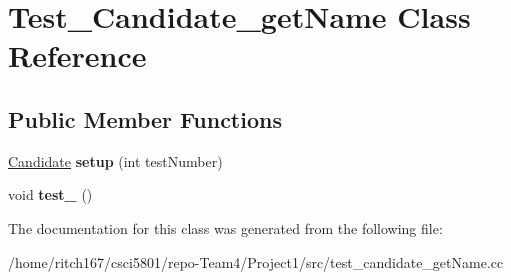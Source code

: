 \hypertarget{classTest__Candidate__getName}{}\section{Test\+\_\+\+Candidate\+\_\+get\+Name Class Reference}
\label{classTest__Candidate__getName}
\subsection*{Public Member Functions}
\begin{DoxyCompactItemize}
\item 
\mbox{\label{classTest__Candidate__getName_a598893e5c791eee9fcd84e627dcb12ec}} 
\hyperlink{classCandidate}{Candidate} {\bfseries setup} (int test\+Number)
\item 
\mbox{\label{classTest__Candidate__getName_a9647623ffa9cfb5d8e072ae93f89efe0}} 
void {\bfseries test\+\_} ()
\end{DoxyCompactItemize}


The documentation for this class was generated from the following file\+:\begin{DoxyCompactItemize}
\item 
/home/ritch167/csci5801/repo-\/\+Team4/\+Project1/src/test\+\_\+candidate\+\_\+get\+Name.\+cc\end{DoxyCompactItemize}
